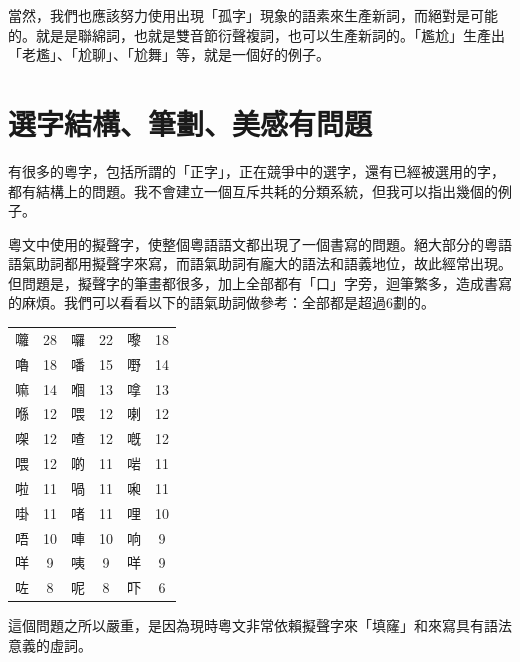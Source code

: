 \documentclass[a5paper, 10pt, openany]{book} %
\begin{document}
當然，我們也應該努力使用出現「孤字」現象的語素來生產新詞，而絕對是可能的。就是是聯綿詞，也就是雙音節衍聲複詞，也可以生產新詞的。「尷尬」生產出「老尷」、「尬聊」、「尬舞」等，就是一個好的例子。

\section{選字結構、筆劃、美感有問題}

有很多的粵字，包括所謂的「正字」，正在競爭中的選字，還有已經被選用的字，都有結構上的問題。我不會建立一個互斥共耗的分類系統，但我可以指出幾個的例子。

粵文中使用的擬聲字，使整個粵語語文都出現了一個書寫的問題。絕大部分的粵語語氣助詞都用擬聲字來寫，而語氣助詞有龐大的語法和語義地位，故此經常出現。但問題是，擬聲字的筆畫都很多，加上全部都有「口」字旁，迴筆繁多，造成書寫的麻煩。我們可以看看以下的語氣助詞做參考：全部都是超過6劃的。 


  \begin{table}[H]
    \centering
    \begin{tabular}{l c l c l c}
    \toprule
    \midrule
    囖 & 28 & 囉 & 22 & 嚟 & 18 \\
    嚕 & 18 & 噃 & 15 & 嘢 & 14 \\
    嘛 & 14 & 嗰 & 13 & 嗱 & 13 \\
    喺 & 12 & 喂 & 12 & 喇 & 12 \\
    㗎 & 12 & 喳 & 12 & 嘅 & 12 \\
    喂 & 12 & 啲 & 11 & 啱 & 11 \\
    啦 & 11 & 喎 & 11 & 啝 & 11 \\
    啩 & 11 & 啫 & 11 & 哩 & 10 \\
    唔 & 10 & 唓 & 10 & 响 & 9 \\
    咩 & 9 & 咦 & 9 & 咩 & 9 \\
    咗 & 8 & 呢 & 8 & 吓 & 6 \\
    \bottomrule
    \end{tabular}
    \end{table}

這個問題之所以嚴重，是因為現時粵文非常依賴擬聲字來「填窿」和來寫具有語法意義的虛詞。
\end{document}
